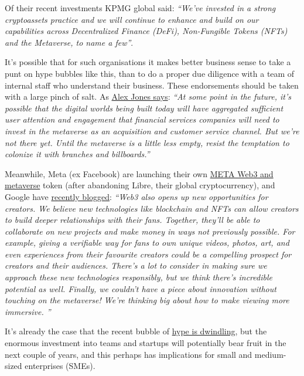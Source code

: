 \documentclass[
	12pt, %
	fleqn, %
	a4paper, %
	oneside, %
]{LegrandOrangeBook}
\begin{document}
Of their recent investments KPMG global said: \textit{``We've invested in a strong cryptoassets practice and we will continue to enhance and build on our capabilities across Decentralized Finance (DeFi), Non-Fungible Tokens (NFTs) and the Metaverse, to name a few''}.\par
It's possible that for such organisations it makes better business sense to take a punt on hype bubbles like this, than to do a proper due diligence with a team of internal staff who understand their business. These endorsements should be taken with a large pinch of salt. As \href{https://newsletter.fintechtakes.com/p/metaverse-branches?s=r}{Alex Jones says}: \textit{``At some point in the future, it’s possible that the digital worlds being built today will have aggregated sufficient user attention and engagement that financial services companies will need to invest in the metaverse as an acquisition and customer service channel. But we’re not there yet. Until the metaverse is a little less empty, resist the temptation to colonize it with branches and billboards.''}\par
Meanwhile, Meta (ex Facebook) are launching their own \href{https://archive.ph/coyp2}{META Web3 and metaverse} token (after abandoning Libre, their global cryptocurrency), and Google have \href{https://blog.youtube/inside-youtube/innovations-for-2022-at-youtube/}{recently blogged}: \textit{``Web3 also opens up new opportunities for creators. We believe new technologies like blockchain and NFTs can allow creators to build deeper relationships with their fans. Together, they'll be able to collaborate on new projects and make money in ways not previously possible. For example, giving a verifiable way for fans to own unique videos, photos, art, and even experiences from their favourite creators could be a compelling prospect for creators and their audiences. There's a lot to consider in making sure we approach these new technologies responsibly, but we think there's incredible potential as well. Finally, we couldn't have a piece about innovation without touching on the metaverse! We're thinking big about how to make viewing more immersive. ''}\par
It's already the case that the recent bubble of \href{https://www.forbes.com/sites/paultassi/2022/03/10/interest-in-nfts-and-the-metaverse-is-falling-fast/?}{hype is dwindling}, but the enormous investment into teams and startups will potentially bear fruit in the next couple of years, and this perhaps has implications for small and medium-sized enterprises (SMEs). \par
\end{document}

